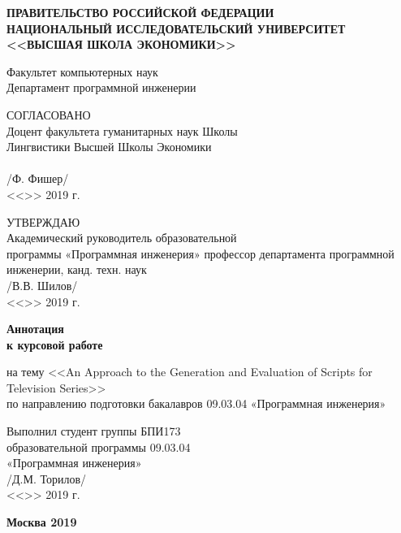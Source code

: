 \documentclass{article}
\newcommand{\signature}[1]{\underline{\hspace{10em}} /#1/}
\newcommand{\datefield}[1]{<<\underline{\hspace{1.8em}}>>\underline{\hspace{10.5em}} #1 г.}
\newcommand{\peoplefield}[3]{#1\\ \signature{#2} \\ \datefield{#3}}
\begin{document}
\begin{titlepage}
\begin{center}
    {\large \textbf{ПРАВИТЕЛЬСТВО РОССИЙСКОЙ ФЕДЕРАЦИИ\\
    НАЦИОНАЛЬНЫЙ ИССЛЕДОВАТЕЛЬСКИЙ УНИВЕРСИТЕТ\\
    <<ВЫСШАЯ ШКОЛА ЭКОНОМИКИ>>}\\}

    \vspace{2.5em}
    Факультет компьютерных наук\\
    Департамент программной инженерии
\end{center}

\begin{minipage}[t]{0.5\textwidth}
    \peoplefield{СОГЛАСОВАНО\\Доцент факультета
    гуманитарных наук Школы\\ Лингвистики Высшей
    Школы Экономики\\}{Ф. Фишер}{2019}
\end{minipage}
\begin{minipage}[t]{0.5\textwidth}
    \peoplefield{УТВЕРЖДАЮ\\Академический руководитель
    образовательной\\ программы
    «Программная инженерия»
    профессор департамента программной
    инженерии, канд. техн. наук}{В.В. Шилов}{2019}
\end{minipage}

\vspace{7em}
\begin{center}
    \textbf{Аннотация\\к курсовой работе}

    \vspace{3em}
    на тему <<An Approach to the Generation and Evaluation of Scripts for Television Series>>\\

    \vspace{2em}
    по направлению подготовки бакалавров 09.03.04 «Программная инженерия»\\
\end{center}

\vspace{8em}
\begin{flushright}
\begin{minipage}[t]{0.4\textwidth}
    \peoplefield{Выполнил
    студент группы БПИ173\\
    образовательной программы
    09.03.04\\ «Программная
    инженерия»}{Д.М. Торилов}{2019}
\end{minipage}
\end{flushright}
 
\begin{center}
    \vfill
    \textbf{Москва 2019}
\end{center}

\end{titlepage}
\end{document}
